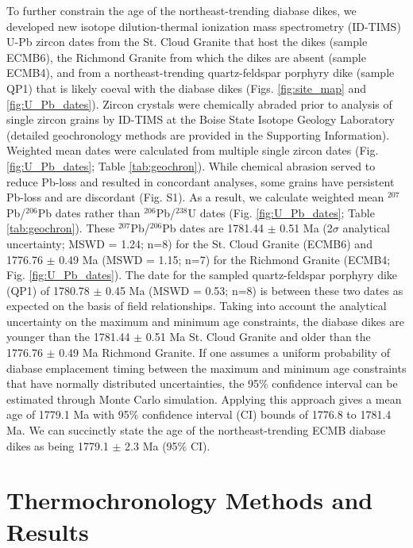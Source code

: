 \documentclass[draft]{agujournal2019}
\begin{document}
To further constrain the age of the northeast-trending diabase dikes, we developed new isotope dilution-thermal ionization mass spectrometry (ID-TIMS) U-Pb zircon dates from the St. Cloud Granite that host the dikes (sample ECMB6), the Richmond Granite from which the dikes are absent (sample ECMB4), and from a northeast-trending quartz-feldspar porphyry dike (sample QP1) that is likely coeval with the diabase dikes (Figs. \ref{fig:site_map} and \ref{fig:U_Pb_dates}). Zircon crystals were chemically abraded prior to analysis of single zircon grains by ID-TIMS at the Boise State Isotope Geology Laboratory (detailed geochronology methods are provided in the Supporting Information). Weighted mean dates were calculated from multiple single zircon dates (Fig. \ref{fig:U_Pb_dates}; Table \ref{tab:geochron}). While chemical abrasion served to reduce Pb-loss and resulted in concordant analyses, some grains have persistent Pb-loss and are discordant (Fig. S1). As a result, we calculate weighted mean  $^{207}$Pb/$^{206}$Pb dates rather than $^{206}$Pb/$^{238}$U dates (Fig. \ref{fig:U_Pb_dates}; Table \ref{tab:geochron}). These $^{207}$Pb/$^{206}$Pb dates are 1781.44 $\pm$ 0.51 Ma (2$\sigma$ analytical uncertainty; MSWD = 1.24; n=8) for the St. Cloud Granite (ECMB6) and 1776.76 $\pm$ 0.49 Ma (MSWD = 1.15; n=7) for the Richmond Granite (ECMB4; Fig. \ref{fig:U_Pb_dates}). The date for the sampled quartz-feldspar porphyry dike (QP1) of 1780.78 $\pm$ 0.45 Ma (MSWD = 0.53; n=8) is between these two dates as expected on the basis of field relationships. Taking into account the analytical uncertainty on the maximum and minimum age constraints, the diabase dikes are younger than the 1781.44 $\pm$ 0.51 Ma St. Cloud Granite and older than the 1776.76 $\pm$ 0.49 Ma Richmond Granite. If one assumes a uniform probability of diabase emplacement timing between the maximum and minimum age constraints that have normally distributed uncertainties, the 95\% confidence interval can be estimated through Monte Carlo simulation. Applying this approach gives a mean age of 1779.1 Ma with 95$\%$ confidence interval (CI) bounds of 1776.8 to 1781.4 Ma. We can succinctly state the age of the northeast-trending ECMB diabase dikes as being 1779.1 $\pm$ 2.3 Ma (95\% CI). 

\section{Thermochronology Methods and Results}
\end{document}
